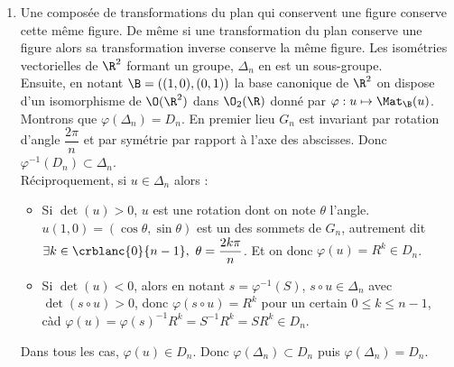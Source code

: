 \documentclass[8pt]{book}
\begin{document}
\begin{enumerate}[leftmargin=*]
		On calcule $|z_{k+1}-z_k|=|e^{2i\pi/n}z_k-z_k|=|e^{2i\pi/n}-1||z_k|=|e^{2i\pi/n}-1|$.\\
		Ainsi les coordonnées des sommets de $G_n$ sont $\left(\cos\left(\dfrac{2k\pi}{n}\right),\sin\left(\dfrac{2k\pi}{n}\right)\right)$ pour $0\leq k\leq n-1$.
		\item Une composée de transformations du plan qui conservent une figure conserve cette même figure. De même si une transformation du plan conserve une figure alors sa transformation inverse conserve la même figure. Les isométries vectorielles de $\R^2$ formant un groupe, $\Delta_n$ en est un sous-groupe.\\
		Ensuite, en notant $\B=((1,0),(0,1))$ la base canonique de $\R^2$ on dispose d'un isomorphisme de $\O(\R^2)$ dans $\O_2(\R)$ donné par $\varphi:u\mapsto \Mat_\B(u)$. Montrons que $\varphi(\Delta_n)=D_n$. En premier lieu $G_n$ est invariant par rotation d'angle $\dfrac{2\pi}{n}$ et par symétrie par rapport à l'axe des abscisses. Donc $\varphi^{-1}(D_n)\subset\Delta_n$.\\
		Réciproquement, si $u\in \Delta_n$ alors :
		\begin{itemize}
			\item Si $\det(u)>0$, $u$ est une rotation dont on note $\theta$ l'angle. $u(1,0)=(\cos\theta,\sin\theta)$ est un des sommets de $G_n$, autrement dit $\exists k\in \crblanc{0}{n-1},\ \theta=\dfrac{2k\pi}{n}$. Et on donc $\varphi(u)=R^k\in D_n$.
			\item Si $\det(u)<0$, alors en notant $s=\varphi^{-1}(S)$, $s\circ u\in \Delta_n$ avec $\det(s\circ u)>0$, donc $\varphi(s\circ u)=R^k$ pour un certain $0\leq k\leq n-1$, càd $\varphi(u)=\varphi(s)^{-1}R^k=S^{-1}R^k=SR^k\in D_n$.
		\end{itemize}
		Dans tous les cas, $\varphi(u)\in D_n$. Donc $\varphi(\Delta_n)\subset D_n$ puis $\varphi(\Delta_n)=D_n$.
	\end{enumerate}
	
\end{document}
